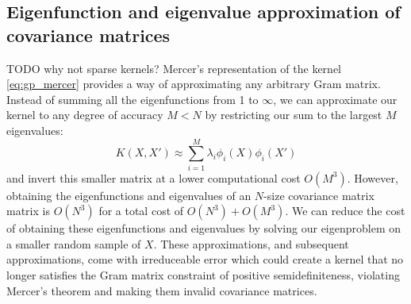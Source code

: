 \subsection{Eigenfunction and eigenvalue approximation of covariance matrices \cite{gp-ml}}
TODO why not sparse kernels? Mercer's representation of the kernel \ref{eq:gp_mercer} provides a way of approximating any arbitrary Gram matrix. Instead of summing all the eigenfunctions from 1 to $\infty$, we can approximate our kernel to any degree of accuracy $M < N$ by restricting our sum to the largest $M$ eigenvalues:
\begin{equation} \label{eq:gp_mercer_approx}
    K(X, X') \approx \sum_{i=1}^{M} \lambda_i \phi_i(X) \phi_i(X')
\end{equation}
and invert this smaller matrix at a lower computational cost $O(M^3)$. However, obtaining the eigenfunctions and eigenvalues of an $N$-size covariance matrix matrix is $O(N^3)$ for a total cost of $O(N^3) + O(M^3)$. We can reduce the cost of obtaining these eigenfunctions and eigenvalues by solving our eigenproblem on a smaller random sample of $X$. These approximations, and subsequent approximations, come with irreduceable error which could create a kernel that no longer satisfies the Gram matrix constraint of positive semidefiniteness, violating Mercer's theorem and making them invalid covariance matrices. 

